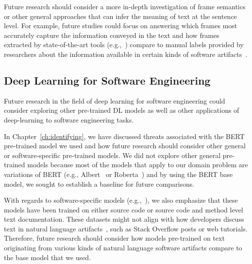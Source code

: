 Future research should consider
a more in-depth investigation of 
frame semantics or other general approaches that can infer the meaning of text at the sentence level. 
For example, future studies could focus on answering 
which frames most accurately capture the information conveyed in the text 
and how frames extracted by state-of-the-art tools (e.g.,~\cite{swayamdipta17, chen2021joint})
compare to manual labels provided by researchers 
about the information available in certain kinds of software artifacts~\cite{Maalej2013, Arya2019, Sorbo2015}.  



 






\subsection{Deep Learning for Software Engineering}
\label{cp7:deep-learning}



Future research in the field of deep learning for software engineering could consider 
exploring other pre-trained \acs{DL} models as well as other applications of 
deep-learning to software engineering tasks. 




In Chapter~\ref{ch:identifying}, we have discussed threats associated with the BERT pre-trained model 
we used and how future research should consider other 
general or software-specific pre-trained models.
We did not explore other general pre-trained models because most of the models that apply to our domain problem 
are variations of BERT (e.g., Albert~\cite{lan2019albert} or Roberta~\cite{liu2019roberta})
and by using the BERT base model, we sought to establish a baseline for future comparisons.




With regards to software-specific models (e.g.,~\cite{feng2020-codebert, li2019neural}), we also emphasize 
that these models have been trained on either source code or source code and method level text documentation. 
These datasets might not align with how developers discuss text in natural language artifacts~\cite{arya2020}, such 
as Stack Overflow posts or web tutorials. Therefore, future research should consider how 
 models pre-trained on text originating from various kinds of 
natural language software artifacts compare to the base model that we used.





